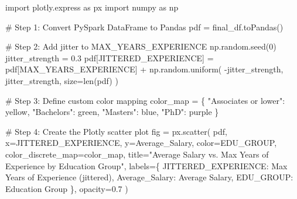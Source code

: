 \documentclass[
  letterpaper,
  DIV=11,
  numbers=noendperiod]{scrartcl}
\newenvironment{Shaded}{\begin{snugshade}}{\end{snugshade}}
\newcommand{\BuiltInTok}[1]{\textcolor[rgb]{0.00,0.23,0.31}{#1}}
\newcommand{\CommentTok}[1]{\textcolor[rgb]{0.37,0.37,0.37}{#1}}
\newcommand{\DecValTok}[1]{\textcolor[rgb]{0.68,0.00,0.00}{#1}}
\newcommand{\FloatTok}[1]{\textcolor[rgb]{0.68,0.00,0.00}{#1}}
\newcommand{\ImportTok}[1]{\textcolor[rgb]{0.00,0.46,0.62}{#1}}
\newcommand{\NormalTok}[1]{\textcolor[rgb]{0.00,0.23,0.31}{#1}}
\newcommand{\OperatorTok}[1]{\textcolor[rgb]{0.37,0.37,0.37}{#1}}
\newcommand{\StringTok}[1]{\textcolor[rgb]{0.13,0.47,0.30}{#1}}
\begin{document}
\begin{Shaded}
\begin{Highlighting}[]
\ImportTok{import}\NormalTok{ plotly.express }\ImportTok{as}\NormalTok{ px}
\ImportTok{import}\NormalTok{ numpy }\ImportTok{as}\NormalTok{ np}

\CommentTok{\# Step 1: Convert PySpark DataFrame to Pandas}
\NormalTok{pdf }\OperatorTok{=}\NormalTok{ final\_df.toPandas()}

\CommentTok{\# Step 2: Add jitter to MAX\_YEARS\_EXPERIENCE}
\NormalTok{np.random.seed(}\DecValTok{0}\NormalTok{)}
\NormalTok{jitter\_strength }\OperatorTok{=} \FloatTok{0.3}
\NormalTok{pdf[}\StringTok{\textquotesingle{}JITTERED\_EXPERIENCE\textquotesingle{}}\NormalTok{] }\OperatorTok{=}\NormalTok{ pdf[}\StringTok{\textquotesingle{}MAX\_YEARS\_EXPERIENCE\textquotesingle{}}\NormalTok{] }\OperatorTok{+}\NormalTok{ np.random.uniform(}
    \OperatorTok{{-}}\NormalTok{jitter\_strength, jitter\_strength, size}\OperatorTok{=}\BuiltInTok{len}\NormalTok{(pdf)}
\NormalTok{)}

\CommentTok{\# Step 3: Define custom color mapping}
\NormalTok{color\_map }\OperatorTok{=}\NormalTok{ \{}
    \StringTok{"Associate\textquotesingle{}s or lower"}\NormalTok{: }\StringTok{\textquotesingle{}yellow\textquotesingle{}}\NormalTok{,}
    \StringTok{"Bachelor\textquotesingle{}s"}\NormalTok{: }\StringTok{\textquotesingle{}green\textquotesingle{}}\NormalTok{,}
    \StringTok{"Master\textquotesingle{}s"}\NormalTok{: }\StringTok{\textquotesingle{}blue\textquotesingle{}}\NormalTok{,}
    \StringTok{"PhD"}\NormalTok{: }\StringTok{\textquotesingle{}purple\textquotesingle{}}
\NormalTok{\}}

\CommentTok{\# Step 4: Create the Plotly scatter plot}
\NormalTok{fig }\OperatorTok{=}\NormalTok{ px.scatter(}
\NormalTok{    pdf,}
\NormalTok{    x}\OperatorTok{=}\StringTok{\textquotesingle{}JITTERED\_EXPERIENCE\textquotesingle{}}\NormalTok{,}
\NormalTok{    y}\OperatorTok{=}\StringTok{\textquotesingle{}Average\_Salary\textquotesingle{}}\NormalTok{,}
\NormalTok{    color}\OperatorTok{=}\StringTok{\textquotesingle{}EDU\_GROUP\textquotesingle{}}\NormalTok{,}
\NormalTok{    color\_discrete\_map}\OperatorTok{=}\NormalTok{color\_map,}
\NormalTok{    title}\OperatorTok{=}\StringTok{"Average Salary vs. Max Years of Experience by Education Group"}\NormalTok{,}
\NormalTok{    labels}\OperatorTok{=}\NormalTok{\{}
        \StringTok{\textquotesingle{}JITTERED\_EXPERIENCE\textquotesingle{}}\NormalTok{: }\StringTok{\textquotesingle{}Max Years of Experience (jittered)\textquotesingle{}}\NormalTok{,}
        \StringTok{\textquotesingle{}Average\_Salary\textquotesingle{}}\NormalTok{: }\StringTok{\textquotesingle{}Average Salary\textquotesingle{}}\NormalTok{,}
        \StringTok{\textquotesingle{}EDU\_GROUP\textquotesingle{}}\NormalTok{: }\StringTok{\textquotesingle{}Education Group\textquotesingle{}}
\NormalTok{    \},}
\NormalTok{    opacity}\OperatorTok{=}\FloatTok{0.7}
\NormalTok{)}


\end{Highlighting}
\end{Shaded}
\end{document}
